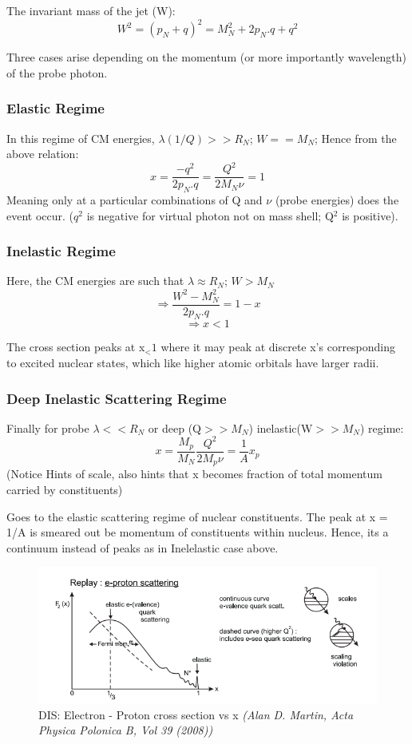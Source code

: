 \documentclass[11pt]{article}
\begin{document}
	The invariant mass of the jet (W):
	\[
		W^2 = (p_N + q)^2 = M_N^2 + 2p_N.q + q^2
	\]
	
	Three cases arise depending on the momentum (or more importantly wavelength) of the probe photon. 
		
	\subsubsection{Elastic Regime}
	
	In this regime of CM energies, $\lambda (1/Q) >> R_N $; $W = = M_N$; Hence from the above relation:
	\[
		x = \frac{-q^2}{2p_N.q} = \frac{Q^2}{2M_N\nu} = 1
	\]
	Meaning only at a particular combinations of Q and $\nu$ (probe energies) does the event occur. ($q^2$ is negative for virtual photon not on mass shell; Q$^2$ is positive).
	
	\subsubsection{Inelastic Regime}
	
	Here, the CM energies are such that $\lambda \approx R_N$;
	$W > M_N$
	\[
		\Rightarrow \frac{W^2 - M_N^2}{2p_N.q} = 1 - x  
	\]
	\[
		\Rightarrow x < 1
	\]
	
	The cross section peaks at x$_< 1$ where it may peak at discrete x's corresponding to excited nuclear states, which like higher atomic orbitals have larger radii.
	
	\subsubsection{Deep Inelastic Scattering Regime}
	
	Finally for probe $\lambda << R_N$ or deep (Q$>>M_N$) inelastic(W$>>M_N$) regime:
	\[
		x = \frac{M_p}{M_N} \frac{Q^2}{2M_p \nu} = \frac{1}{A} x_p
	\]
	(Notice Hints of scale, also hints that x becomes fraction of total momentum carried by constituents)
	
	Goes to the elastic scattering regime of nuclear constituents. The peak at x = 1/A is smeared out be momentum of constituents within nucleus. Hence, its a continuum instead of peaks as in Inelelastic case above.
	
	\begin{figure}[h]
		\centering\includegraphics[scale=0.55]{2.png}
		\caption{\centering DIS: Electron - Proton cross section vs x \newline \textit{(Alan D. Martin, Acta Physica Polonica B, Vol 39 (2008))}} 
		\label{fig:figure2}
	\end{figure}
	
\end{document}
